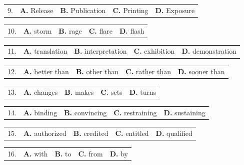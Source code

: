 \documentclass[UTF8,11pt]{ctexart}
\begin{document}
\noindent\begin{tabularx}{\linewidth}{@{}lXXXX@{}}9. & \textbf{A.} Release & \textbf{B.} Publication & \textbf{C.} Printing & \textbf{D.} Exposure\\\end{tabularx}\par

\noindent\begin{tabularx}{\linewidth}{@{}lXXXX@{}}10. & \textbf{A.} storm & \textbf{B.} rage & \textbf{C.} flare & \textbf{D.} flash\\\end{tabularx}\par

\noindent\begin{tabularx}{\linewidth}{@{}lXXXX@{}}11. & \textbf{A.} translation & \textbf{B.} interpretation & \textbf{C.} exhibition & \textbf{D.} demonstration\\\end{tabularx}\par

\noindent\begin{tabularx}{\linewidth}{@{}lXXXX@{}}12. & \textbf{A.} better than & \textbf{B.} other than & \textbf{C.} rather than & \textbf{D.} sooner than\\\end{tabularx}\par

\noindent\begin{tabularx}{\linewidth}{@{}lXXXX@{}}13. & \textbf{A.} changes & \textbf{B.} makes & \textbf{C.} sets & \textbf{D.} turns\\\end{tabularx}\par

\noindent\begin{tabularx}{\linewidth}{@{}lXXXX@{}}14. & \textbf{A.} binding & \textbf{B.} convincing & \textbf{C.} restraining & \textbf{D.} sustaining\\\end{tabularx}\par

\noindent\begin{tabularx}{\linewidth}{@{}lXXXX@{}}15. & \textbf{A.} authorized & \textbf{B.} credited & \textbf{C.} entitled & \textbf{D.} qualified\\\end{tabularx}\par

\noindent\begin{tabularx}{\linewidth}{@{}lXXXX@{}}16. & \textbf{A.} with & \textbf{B.} to & \textbf{C.} from & \textbf{D.} by\\\end{tabularx}\par
\end{document}

